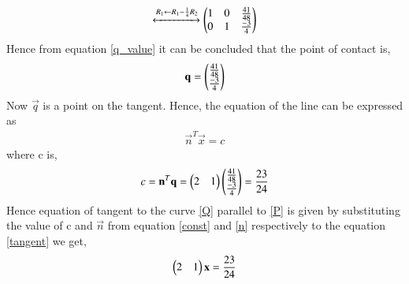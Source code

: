 \documentclass[journal,12pt,twocolumn]{IEEEtran}
\begin{document}
\begin{align}
\xleftrightarrow[]{R_1\leftarrow R_1-\frac{1}{4}R_2} \begin{pmatrix}1&0&\frac{41}{48}\\0&1&\frac{-3}{4}\end{pmatrix}
\label{q_value}
\end{align}
Hence from equation \eqref{q_value} it can be concluded that the point of contact is,
\begin{align}
\mathbf{q} = \begin{pmatrix}\frac{41}{48}\\\frac{-3}{4}\end{pmatrix}
\end{align}
Now $\vec{q}$ is a point on the tangent. Hence, the equation of the
line can be expressed as
\begin{align}
\vec{n}^T\vec{x} = c
\label{tangent}
\end{align}
where c is,
\begin{align}
 c = \mathbf{n}^T\mathbf{q} = \begin{pmatrix}2&1\end{pmatrix}\begin{pmatrix}\frac{41}{48}\\\frac{-3}{4}\end{pmatrix} = \frac{23}{24} 
 \label{const}
\end{align}
Hence equation of tangent to the curve \eqref{Q} parallel to \eqref{P} is given by substituting the value of c and $\vec{n}$ from equation \eqref{const} and \eqref{n} respectively to the equation \eqref{tangent} we get,
\begin{align}
\begin{pmatrix}2&1\end{pmatrix}\mathbf{x} = \frac{23}{24} 
\end{align}
\end{document}
